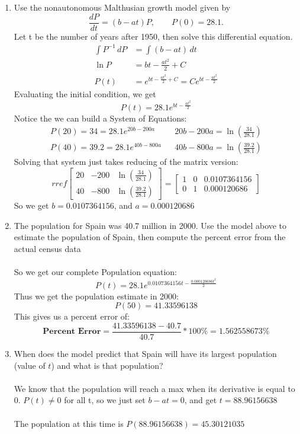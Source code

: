 \documentclass[12pt]{article}
\begin{document}
	\begin{enumerate}[label = (\alph*)]
		\item Use the nonautonomous Malthusian growth model given by
			$$
			\frac{dP}{dt} = (b - at)P, \qquad P(0) = 28.1.
			$$
		Let t be the number of years after 1950, then solve this differential equation.
			\begin{align*}
				\int P^{-1}\,dP &= \int (b - at)\,dt \\
				\ln P &= bt - \frac{at^2}{2} + C \\
				P(t) &= e^{bt - \frac{at^2}{2} + C} = Ce^{bt - \frac{at^2}{2}}
			\end{align*}
		Evaluating the initial condition, we get 
			\boldmath
			$$
			P(t) = 28.1e^{bt - \frac{at^2}{2}}
			$$
			\unboldmath
		Notice the we can build a System of Equations:
			\begin{align*}
				P(20) = 34 = 28.1e^{20b - 200a} && 20b - 200a = \ln\left(\frac{34}{28.1}\right)\\
				P(40) = 39.2 = 28.1e^{40b - 800a} && 40b - 800a = \ln\left(\frac{39.2}{28.1}\right)
			\end{align*}
		Solving that system just takes reducing of the matrix version:
			$$
			rref
			\begin{bmatrix}
				20 & -200 & \ln\left(\frac{34}{28.1}\right) \\
				40 & -800 & \ln\left(\frac{39.2}{28.1}\right)
			\end{bmatrix}
			= 
			\begin{bmatrix}
				1 & 0 & 0.0107364156 \\
				0 & 1 & 0.000120686
			\end{bmatrix}
			$$
			So we get \boldmath$b = 0.0107364156$, and $a = 0.000120686$\unboldmath
			\newpage
			\item The population for Spain was 40.7 million in 2000. Use the model above to estimate the population of Spain, then compute the percent error from the actual census data
			\\ \\
			So we get our complete Population equation:
				$$
				P(t) = 28.1e^{0.0107364156t - \frac{0.000120686t^2}{2}}
				$$
			Thus we get the population estimate in 2000:
				\boldmath
				$$
				P(50) = 41.33596138
				$$
				\unboldmath
			This gives us a percent error of:
				\boldmath
				$$
				\textbf{Percent Error} = \frac{41.33596138 - 40.7}{40.7}*100\% = 1.562558673\%
				$$
				\unboldmath
			\item When does the model predict that Spain will have its largest population (value of $t$) and what is that population?
			\\ \\
			We know that the population will reach a max when its derivative is equal to $0$. $P(t) \not = 0$ for all t, so we just set $b - at = 0$, and get \boldmath$t = 88.96156638$\unboldmath
			\\ \\
			The population at this time is \boldmath$P(88.96156638) = 45.30121035$\unboldmath
	\end{enumerate}
\end{document}
